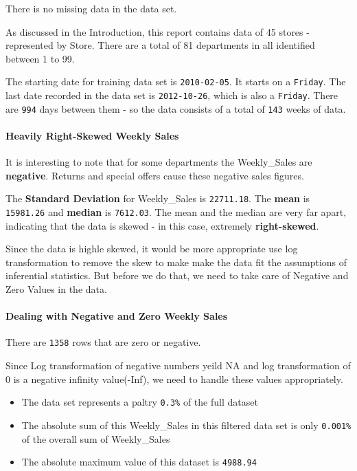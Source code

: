 \documentclass[]{article}
\begin{document}
There is no missing data in the data set.

As discussed in the Introduction, this report contains data of 45 stores
- represented by Store. There are a total of 81 departments in all
identified between 1 to 99.

The starting date for training data set is \texttt{2010-02-05}. It
starts on a \texttt{Friday}. The last date recorded in the data set is
\texttt{2012-10-26}, which is also a \texttt{Friday}. There are
\texttt{994} days between them - so the data consists of a total of
\texttt{143} weeks of data.

\paragraph{Heavily Right-Skewed Weekly
Sales}\label{heavily-right-skewed-weekly-sales}

It is interesting to note that for some departments the Weekly\_Sales
are \textbf{negative}. Returns and special offers cause these negative
sales figures.

The \textbf{Standard Deviation} for Weekly\_Sales is \texttt{22711.18}.
The \textbf{mean} is \texttt{15981.26} and \textbf{median} is
\texttt{7612.03}. The mean and the median are very far apart, indicating
that the data is skewed - in this case, extremely \textbf{right-skewed}.

Since the data is highle skewed, it would be more appropriate use log
transformation to remove the skew to make make the data fit the
assumptions of inferential statistics. But before we do that, we need to
take care of Negative and Zero Values in the data.

\paragraph{Dealing with Negative and Zero Weekly
Sales}\label{dealing-with-negative-and-zero-weekly-sales}

There are \texttt{1358} rows that are zero or negative.

Since Log transformation of negative numbers yeild NA and log
transformation of 0 is a negative infinity value(-Inf), we need to
handle these values appropriately.

\begin{itemize}
\itemsep1pt\parskip0pt
\item
  The data set represents a paltry \texttt{0.3\%} of the full dataset
\item
  The absolute sum of this Weekly\_Sales in this filtered data set is
  only \texttt{0.001\%} of the overall sum of Weekly\_Sales
\item
  The absolute maximum value of this dataset is \texttt{4988.94}
\end{itemize}
\end{document}
